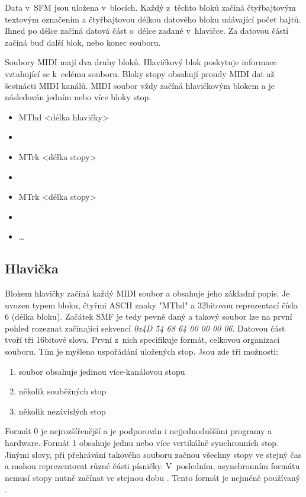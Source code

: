 Data v~SFM jsou uložena v~blocích.
Každý z~těchto bloků začíná čtyřbajtovým textovým označením 
a čtyřbajtovou délkou datového bloku udávající počet bajtů.
Ihned po délce začíná datová část o~délce zadané v~hlavičce.
Za datovou částí začíná buď další blok, nebo konec souboru.
\cite{MIDI_tutorials,Back_SMF_Specif}
\par

Soubory MIDI mají dva druhy bloků. 
Hlavičkový blok poskytuje informace vztahující se k~celému souboru.
Bloky stopy obsahují proudy MIDI dat až šestnácti MIDI kanálů.
MIDI soubor vždy začíná hlavičkovým blokem 
a je následován jedním nebo více bloky stop.\cite{Back_SMF_Specif}

\begin{itemize} [label={}]
    \item MThd <délka hlavičky>
    \item <data hlavičky>
    \item MTrk <délka stopy>
    \item <data stopy>
    \item MTrk <délka stopy>
    \item <data stopy>
    \item \dots
\end{itemize}

\subsection{Hlavička}
Blokem hlavičky začíná každý MIDI soubor a obsahuje jeho základní popis.
Je uvozen typem bloku, čtyřmi ASCII znaky "MThd" 
a 32bitovou reprezentací čísla 6 (délka bloku). 
Začátek SMF je tedy pevně daný a takový soubor lze na první pohled rozeznat začínající sekvencí 
\emph{0x4D 54 68 64 00 00 00 06}. 
Datovou část tvoří tři 16bitové slova.
První z~nich specifikuje formát, celkovou organizaci souboru.
Tím je myšleno uspořádání uložených stop.
Jsou zde tři možnosti:

\begin{enumerate}\addtocounter{enumi}{-1}
    \item soubor obsahuje jedinou více-kanálovou stopu
    \item několik souběžných stop
    \item několik nezávislých stop
\end{enumerate}

Formát 0 je nejrozšířenější a je podporován i nejjednoduššími programy 
a hardware.
\cite{Back_SMF_Specif}
Formát 1 obsahuje jednu nebo více vertikálně synchronních stop.
Jinými slovy, při přehrávání takového souboru 
začnou všechny stopy ve stejný čas 
a mohou reprezentovat různé části písničky.
V~posledním, asynchronním formátu nemusí stopy nutně začínat ve stejnou dobu
\cite{Glatt_aboutMIDIFiles}.
Tento formát je nejméně používaný
\cite{MIDI_tutorials}.
\par

